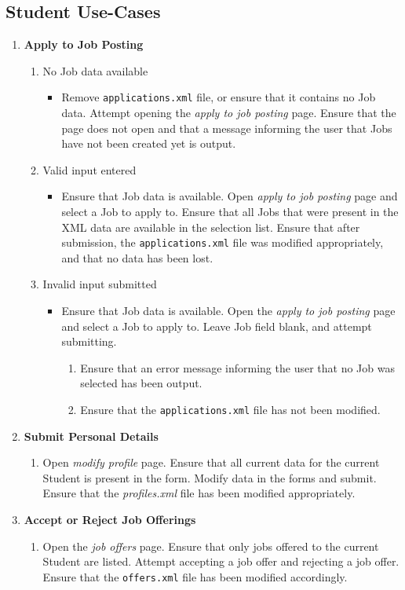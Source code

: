 \documentclass[12pt]{report}
\begin{document}
\subsection{Student Use-Cases}
\begin{enumerate}
	\item \textbf{Apply to Job Posting}
		\begin{enumerate}
			\item No Job data available
			\begin{itemize}
				\item Remove \texttt{applications.xml} file, or ensure that it contains no Job data.
					Attempt opening the \textit{apply to job posting} page. Ensure that the page
					does not open and that a message informing the user that Jobs have not been
					created yet is output.
			\end{itemize}
			\item Valid input entered
			\begin{itemize}
				\item Ensure that Job data is available. Open \textit{apply to job posting} page and
					select a Job to apply to. Ensure that all Jobs that were present in the XML data
					are available in the selection list. Ensure that after submission, the
					\texttt{applications.xml} file was modified appropriately, and that no data has
					been lost.
			\end{itemize}
		\item Invalid input submitted
			\begin{itemize}
				\item Ensure that Job data is available. Open the \textit{apply to job posting} page
					and select a Job to apply to. Leave Job field blank, and attempt submitting.\
					\begin{enumerate}
						\item Ensure that an error message informing the user that no Job was
							selected has been output.
						\item Ensure that the \texttt{applications.xml} file has not been modified.
					\end{enumerate}
			\end{itemize}
		\end{enumerate}
	\item \textbf{Submit Personal Details}
		\begin{enumerate}
			\item Open \textit{modify profile} page. Ensure that all current data for the current
				Student is present in the form. Modify data in the forms and submit. Ensure that the
				\textit{profiles.xml} file has been modified appropriately.
		\end{enumerate}
	\item \textbf{Accept or Reject Job Offerings}
		\begin{enumerate}
			\item Open the \textit{job offers} page. Ensure that only jobs offered to the current
				Student are listed. Attempt accepting a job offer and rejecting a job offer. Ensure
				that the \texttt{offers.xml} file has been modified accordingly.
		\end{enumerate}
\end{enumerate}
\end{document}
